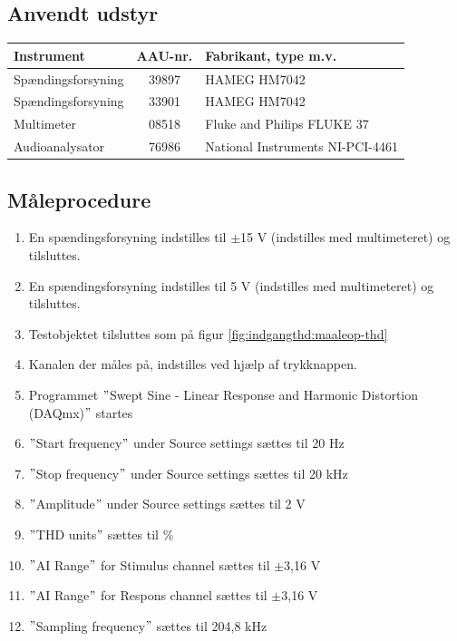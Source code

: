 \clearpage

\subsection*{Anvendt udstyr}

\begin{table}[h]
\centering
\begin{tabular}{l|c|l}
\hline\hline
Instrument & AAU-nr. & Fabrikant, type m.v. \\
\hline\hline
Spændingsforsyning & 39897 & HAMEG HM7042 \\[4pt]
Spændingsforsyning & 33901 & HAMEG HM7042 \\[4pt]
Multimeter & 08518 & Fluke and Philips FLUKE 37 \\[4pt]
Audioanalysator & 76986 & National Instruments NI-PCI-4461 \\
\hline\hline
\end{tabular}
\label{tab:indgang:maaleudstyr_forforstaerker}
\end{table}

\subsection*{Måleprocedure}
\begin{enumerate}
\item En spændingsforsyning indstilles til $\pm$15 V (indstilles med multimeteret) og tilsluttes.
\item En spændingsforsyning indstilles til 5 V (indstilles med multimeteret) og tilsluttes.
\item Testobjektet tilsluttes som på figur \ref{fig:indgangthd:maaleop-thd}
\item Kanalen der måles på, indstilles ved hjælp af trykknappen.
\item Programmet $"$Swept Sine - Linear Response and Harmonic Distortion (DAQmx)$"$ startes
\item $"$Start frequency$"$ under Source settings sættes til 20 Hz
\item $"$Stop frequency$"$ under Source settings sættes til 20 kHz
\item $"$Amplitude$"$ under Source settings sættes til 2 V
\item $"$THD units$"$ sættes til \%
\item $"$AI Range$"$ for Stimulus channel sættes til $\pm$3,16 V
\item $"$AI Range$"$ for Respons channel sættes til $\pm$3,16 V
\item $"$Sampling frequency$"$ sættes til 204,8 kHz
\end{enumerate}

